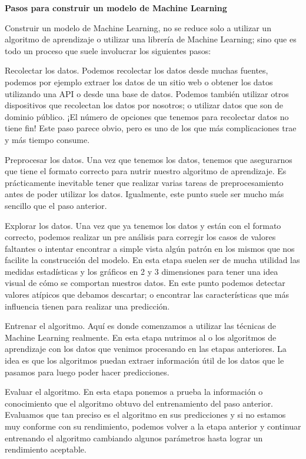 \textbf{Pasos para construir un modelo de Machine Learning}

Construir un modelo de Machine Learning, no se reduce solo a utilizar un algoritmo de aprendizaje o utilizar una librería de Machine Learning; sino que es todo un proceso que suele involucrar los siguientes pasos:

Recolectar los datos. Podemos recolectar los datos desde muchas fuentes, podemos por ejemplo extraer los datos de un sitio web o obtener los datos utilizando una API o desde una base de datos. Podemos también utilizar otros dispositivos que recolectan los datos por nosotros; o utilizar datos que son de dominio público. ¡El número de opciones que tenemos para recolectar datos no tiene fin! Este paso parece obvio, pero es uno de los que más complicaciones trae y más tiempo consume.

Preprocesar los datos. Una vez que tenemos los datos, tenemos que asegurarnos que tiene el formato correcto para nutrir nuestro algoritmo de aprendizaje. Es prácticamente inevitable tener que realizar varias tareas de preprocesamiento antes de poder utilizar los datos. Igualmente, este punto suele ser mucho más sencillo que el paso anterior.

Explorar los datos. Una vez que ya tenemos los datos y están con el formato correcto, podemos realizar un pre análisis para corregir los casos de valores faltantes o intentar encontrar a simple vista algún patrón en los mismos que nos facilite la construcción del modelo. En esta etapa suelen ser de mucha utilidad las medidas estadísticas y los gráficos en 2 y 3 dimensiones para tener una idea visual de cómo se comportan nuestros datos. En este punto podemos detectar valores atípicos que debamos descartar; o encontrar las características que más influencia tienen para realizar una predicción.

Entrenar el algoritmo. Aquí es donde comenzamos a utilizar las técnicas de Machine Learning realmente. En esta etapa nutrimos al o los algoritmos de aprendizaje con los datos que venimos procesando en las etapas anteriores. La idea es que los algoritmos puedan extraer información útil de los datos que le pasamos para luego poder hacer predicciones.

Evaluar el algoritmo. En esta etapa ponemos a prueba la información o conocimiento que el algoritmo obtuvo del entrenamiento del paso anterior. Evaluamos que tan preciso es el algoritmo en sus predicciones y si no estamos muy conforme con su rendimiento, podemos volver a la etapa anterior y continuar entrenando el algoritmo cambiando algunos parámetros hasta lograr un rendimiento aceptable.

